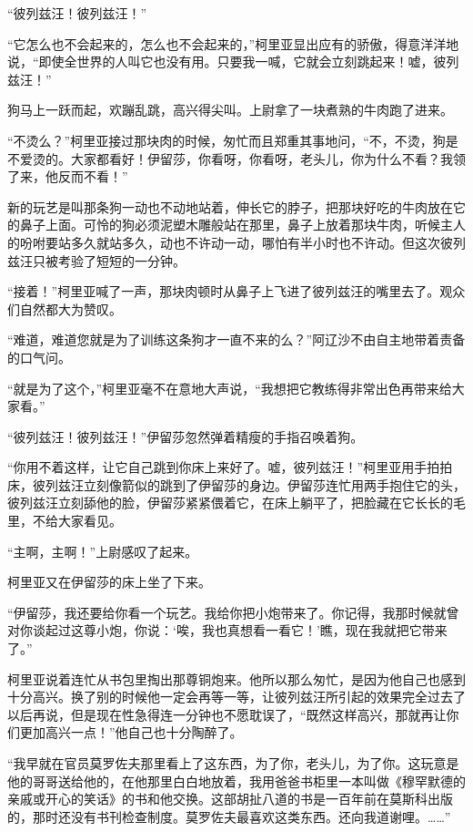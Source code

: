 \par “彼列兹汪！彼列兹汪！”
\par “它怎么也不会起来的，怎么也不会起来的，”柯里亚显出应有的骄傲，得意洋洋地说，“即使全世界的人叫它也没有用。只要我一喊，它就会立刻跳起来！嘘，彼列兹汪！”
\par 狗马上一跃而起，欢蹦乱跳，高兴得尖叫。上尉拿了一块煮熟的牛肉跑了进来。
\par “不烫么？”柯里亚接过那块肉的时候，匆忙而且郑重其事地问，“不，不烫，狗是不爱烫的。大家都看好！伊留莎，你看呀，你看呀，老头儿，你为什么不看？我领了来，他反而不看！”
\par 新的玩艺是叫那条狗一动也不动地站着，伸长它的脖子，把那块好吃的牛肉放在它的鼻子上面。可怜的狗必须泥塑木雕般站在那里，鼻子上放着那块牛肉，听候主人的吩咐要站多久就站多久，动也不许动一动，哪怕有半小时也不许动。但这次彼列兹汪只被考验了短短的一分钟。
\par “接着！”柯里亚喊了一声，那块肉顿时从鼻子上飞进了彼列兹汪的嘴里去了。观众们自然都大为赞叹。
\par “难道，难道您就是为了训练这条狗才一直不来的么？”阿辽沙不由自主地带着责备的口气问。
\par “就是为了这个，”柯里亚毫不在意地大声说，“我想把它教练得非常出色再带来给大家看。”
\par “彼列兹汪！彼列兹汪！”伊留莎忽然弹着精瘦的手指召唤着狗。
\par “你用不着这样，让它自己跳到你床上来好了。嘘，彼列兹汪！”柯里亚用手拍拍床，彼列兹汪立刻像箭似的跳到了伊留莎的身边。伊留莎连忙用两手抱住它的头，彼列兹汪立刻舔他的脸，伊留莎紧紧偎着它，在床上躺平了，把脸藏在它长长的毛里，不给大家看见。
\par “主啊，主啊！”上尉感叹了起来。
\par 柯里亚又在伊留莎的床上坐了下来。
\par “伊留莎，我还要给你看一个玩艺。我给你把小炮带来了。你记得，我那时候就曾对你谈起过这尊小炮，你说：‘唉，我也真想看一看它！’瞧，现在我就把它带来了。”
\par 柯里亚说着连忙从书包里掏出那尊铜炮来。他所以那么匆忙，是因为他自己也感到十分高兴。换了别的时候他一定会再等一等，让彼列兹汪所引起的效果完全过去了以后再说，但是现在性急得连一分钟也不愿耽误了，“既然这样高兴，那就再让你们更加高兴一点！”他自己也十分陶醉了。
\par “我早就在官员莫罗佐夫那里看上了这东西，为了你，老头儿，为了你。这玩意是他的哥哥送给他的，在他那里白白地放着，我用爸爸书柜里一本叫做《穆罕默德的亲戚或开心的笑话》的书和他交换。这部胡扯八道的书是一百年前在莫斯科出版的，那时还没有书刊检查制度。莫罗佐夫最喜欢这类东西。还向我道谢哩。……”
